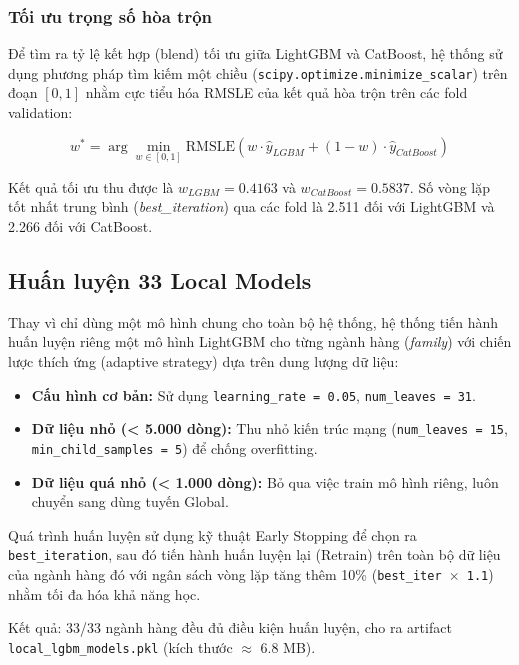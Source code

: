 \documentclass[12pt,a4paper]{report}
\begin{document}
\subsubsection{Tối ưu trọng số hòa trộn}
Để tìm ra tỷ lệ kết hợp (blend) tối ưu giữa LightGBM và CatBoost, hệ thống sử dụng phương pháp tìm kiếm một chiều (\texttt{scipy.optimize.minimize\_scalar}) trên đoạn $[0, 1]$ nhằm cực tiểu hóa RMSLE của kết quả hòa trộn trên các fold validation:

\begin{equation}
    w^* = \arg\min_{w \in [0,1]} \text{RMSLE} \left( w \cdot \hat{y}_{LGBM} + (1 - w) \cdot \hat{y}_{CatBoost} \right)
\end{equation}

Kết quả tối ưu thu được là $w_{LGBM} = 0.4163$ và $w_{CatBoost} = 0.5837$. Số vòng lặp tốt nhất trung bình (\textit{best\_iteration}) qua các fold là 2.511 đối với LightGBM và 2.266 đối với CatBoost.

\subsection{Huấn luyện 33 Local Models}
Thay vì chỉ dùng một mô hình chung cho toàn bộ hệ thống, hệ thống tiến hành huấn luyện riêng một mô hình LightGBM cho từng ngành hàng (\textit{family}) với chiến lược thích ứng (adaptive strategy) dựa trên dung lượng dữ liệu:

\begin{itemize}
    \item \textbf{Cấu hình cơ bản:} Sử dụng \texttt{learning\_rate = 0.05}, \texttt{num\_leaves = 31}.
    \item \textbf{Dữ liệu nhỏ (< 5.000 dòng):} Thu nhỏ kiến trúc mạng (\texttt{num\_leaves = 15}, \texttt{min\_child\_samples = 5}) để chống overfitting.
    \item \textbf{Dữ liệu quá nhỏ (< 1.000 dòng):} Bỏ qua việc train mô hình riêng, luôn chuyển sang dùng tuyến Global.
\end{itemize}

Quá trình huấn luyện sử dụng kỹ thuật Early Stopping để chọn ra \texttt{best\_iteration}, sau đó tiến hành huấn luyện lại (Retrain) trên toàn bộ dữ liệu của ngành hàng đó với ngân sách vòng lặp tăng thêm 10\% (\texttt{best\_iter $\times$ 1.1}) nhằm tối đa hóa khả năng học. 

Kết quả: 33/33 ngành hàng đều đủ điều kiện huấn luyện, cho ra artifact \texttt{local\_lgbm\_models.pkl} (kích thước $\approx$ 6.8 MB).
\end{document}
